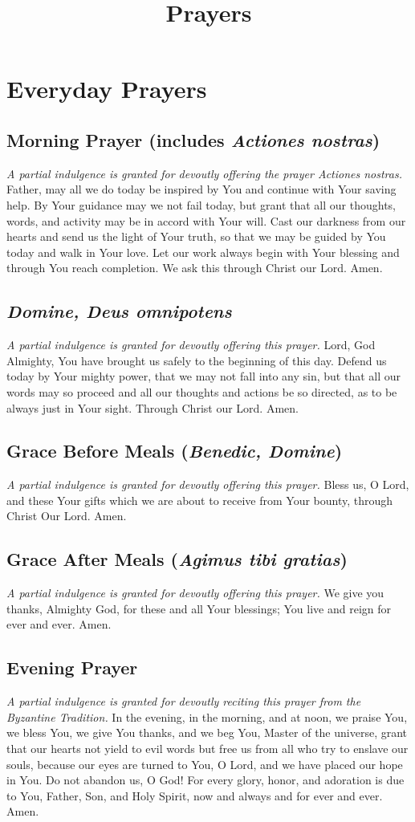 \documentclass[12pt]{article}
\newcommand{\prayersection}[1]{\section{#1}}
\newcommand{\prayertitle}[1]{\subsection{#1}}
\newcommand{\indulgencedprayertitle}[1]{\prayertitle{#1 \protect\kreuz}}
\newcommand{\foreign}[1]{\textsl{#1}}
\newcommand{\note}[1]{{\small{\textsl{#1}}}\newline}
\begin{document}
\title{\textbf{Prayers}\date{\vspace{-10ex}}}\maketitle
\tableofcontents\newpage

\prayersection{Everyday Prayers}
\indulgencedprayertitle{Morning Prayer (includes \foreign{Actiones nostras})}
\note{A partial indulgence is granted for devoutly offering the prayer \foreign{Actiones nostras}.}
Father, may all we do today be inspired by You and continue with Your saving help.
By Your guidance may we not fail today, but grant that all our thoughts, words, and activity may be in accord with Your will.
Cast our darkness from our hearts and send us the light of Your truth, so that we may be guided by You today and walk in Your love.
Let our work always begin with Your blessing and through You reach completion.
We ask this through Christ our Lord.
Amen.

\indulgencedprayertitle{\foreign{Domine, Deus omnipotens}}
\note{A partial indulgence is granted for devoutly offering this prayer.}
Lord, God Almighty, You have brought us safely to the beginning of this day.
Defend us today by Your mighty power, that we may not fall into any sin, but that all our words may so proceed and all our thoughts and actions be so directed, as to be always just in Your sight.
Through Christ our Lord.
Amen.

\indulgencedprayertitle{Grace Before Meals (\foreign{Benedic, Domine})}
\note{A partial indulgence is granted for devoutly offering this prayer.}
Bless us, O Lord, and these Your gifts which we are about to receive from Your bounty, through Christ Our Lord.
Amen.

\indulgencedprayertitle{Grace After Meals (\foreign{Agimus tibi gratias})}
\note{A partial indulgence is granted for devoutly offering this prayer.}
We give you thanks, Almighty God, for these and all Your blessings;
You live and reign for ever and ever.
Amen.
\newpage
\indulgencedprayertitle{Evening Prayer}
\note{A partial indulgence is granted for devoutly reciting this prayer from the Byzantine Tradition.}
In the evening, in the morning, and at noon, we praise You, we bless You,
we give You thanks, and we beg You, Master of the universe, grant that our hearts not yield to evil words but free us from all who try to enslave our souls, because our eyes are turned to You, O Lord, and we have placed our hope in You.
Do not abandon us, O God!
For every glory, honor, and adoration is due to You, Father, Son, and Holy Spirit, now and always and for ever and ever.
Amen.
\end{document}
